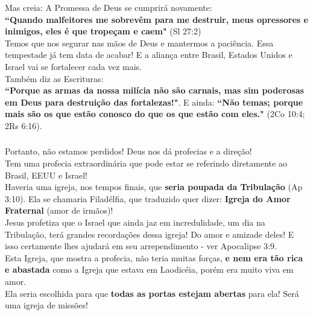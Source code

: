 \documentclass[aspectratio=169]{beamer}
\begin{document}
\begin{frame}
  \centering
		Mas creia: A Promessa de Deus se cumprirá novamente:\\
				\vspace{.5cm}
\textbf{``Quando malfeitores me sobrevêm para me destruir, meus opressores e inimigos, eles é que tropeçam e caem"} (Sl 27:2)\\
\vspace{.5cm}
Temos que nos segurar nas mãos de Deus e mantermos a paciência. Essa tempestade já tem data de acabar! E a aliança entre Brasil, Estados Unidos e Israel vai se fortalecer cada vez mais.\\
  \vspace{.2cm}
	  Também diz as Escrituras: \\
	  \textbf{``Porque as armas da nossa milícia não são carnais, mas sim poderosas em Deus para destruição das fortalezas!"}. E ainda: \textbf{``Não temas; porque mais são os que estão conosco do que os que estão com eles."} (2Co 10:4; 2Rs 6:16).\\
	\end{frame}
	
	
	
\begin{frame}
	  \frametitle{}
	  \framesubtitle{}
	    \centering
  \small
  Portanto, não estamos perdidos! Deus nos dá profecias e a direção!\\
  \vspace{.2cm}
  Tem uma profecia extraordinária que pode estar se referindo diretamente ao Brasil, EEUU e Israel! \\
  Haveria uma igreja, nos tempos finais, que \textbf{seria poupada da Tribulação} (Ap 3:10). Ela se chamaria Filadélfia, que traduzido quer dizer: \textbf{Igreja do Amor Fraternal} (amor de irmãos)! \\
  Jesus profetiza que o Israel que ainda jaz em incredulidade, um dia na Tribulação, terá grandes recordações dessa igreja! Do amor e amizade deles! E isso certamente lhes ajudará em seu arrependimento - ver Apocalipse 3:9.\\
  \vspace{.2cm}
	Esta Igreja, que mostra a profecia, não teria muitas forças, \textbf{e nem era tão rica e abastada} como a Igreja que estava em Laodicéia, porém era muito viva em amor. \\
	Ela seria escolhida para que \textbf{todas as portas estejam abertas} para ela! Será uma igreja de missões! \\
	\end{frame}
\end{document}
